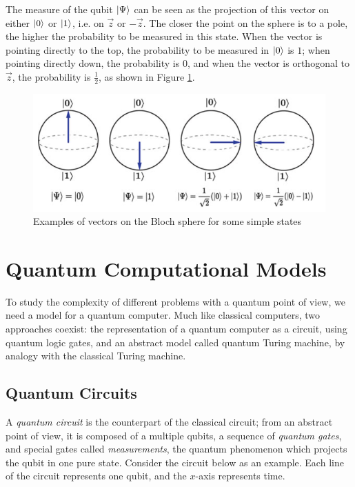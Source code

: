 \documentclass[12pt,a4paper]{article}
\theoremstyle{plain}
\theoremstyle{definition}
\DeclarePairedDelimiter\ket{\lvert}{\rangle}
\begin{document}
The measure of the qubit $\ket{\Psi}$ can be seen as the projection of this vector on either $\ket{0}$ or $\ket{1}$, i.e. on $\vec{z}$ or $-\vec{z}$. The closer the point on the sphere is to a pole, the higher the probability to be measured in this state. When the vector is pointing directly to the top, the probability to be measured in $\ket{0}$ is $1$; when pointing directly down, the probability is $0$, and when the vector is orthogonal to $\vec{z}$, the probability is $\frac{1}{2}$, as shown in Figure \ref{fig:bloch-examples}.

\begin{figure}[!ht]
    \centering
    \includegraphics*[scale=0.4]{bloch-examples.png}
    \caption{Examples of vectors on the Bloch sphere for some simple states}
    \label{fig:bloch-examples}
\end{figure}

\section{Quantum Computational Models}
To study the complexity of different problems with a quantum point of view, we need a model for a quantum computer. Much like classical computers, two approaches coexist: the representation of a quantum computer as a circuit, using quantum logic gates, and an abstract model called quantum Turing machine, by analogy with the classical Turing machine.

\subsection{Quantum Circuits}
A \emph{quantum circuit} is the counterpart of the classical circuit; from an abstract point of view, it is composed of a multiple qubits, a sequence of \emph{quantum gates}, and special gates called \emph{measurements}, the quantum phenomenon which projects the qubit in one pure state. Consider the circuit below as an example. Each line of the circuit represents one qubit, and the $x$-axis represents time.
\end{document}
